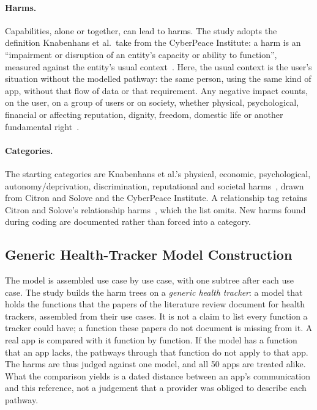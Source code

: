 \paragraph{Harms.} Capabilities, alone or together, can lead to harms. The
study adopts the definition Knabenhans et al.\ take from the CyberPeace
Institute: a harm is an \enquote{impairment or disruption of an entity's
capacity or ability to function}, measured against the entity's usual
context~\parencite[\S4.1]{knabenhans2026harms}. Here, the usual context is the
user's situation without the modelled pathway: the same person, using the same
kind of app, without that flow of data or that requirement. Any negative
impact counts, on the user, on a group of users or on society, whether
physical, psychological, financial or affecting reputation, dignity, freedom,
domestic life or another fundamental
right~\parencite[\S4.1]{knabenhans2026harms}.

\paragraph{Categories.} The starting categories are Knabenhans et al.'s physical, economic,
psychological, autonomy/\allowbreak deprivation, discrimination, reputational
and societal harms~\parencite[App.~A]{knabenhans2026harms}, drawn from Citron
and Solove and the CyberPeace Institute. A relationship tag retains Citron and
Solove's relationship harms~\parencite{citron2021harms}, which the list omits.
New harms found during coding are documented rather than forced into a
category.

\subsection{Generic Health-Tracker Model Construction}
\label{sec:generic-model}
The model is assembled use case by use case, with one subtree after each use case.
The study builds the harm trees on a \emph{generic health tracker}: a model that holds
the functions that the papers of the literature review document for health trackers, assembled
from their use cases. It is not a
claim to list every function a tracker could have; a function these papers do not document is
missing from it. A real app is compared with it function by function. If the model
has a function that an app lacks, the pathways through that function do not apply to
that app. The harms are thus judged against one model, and all 50 apps are treated
alike. What the comparison yields is a dated distance between an app's communication and this
reference, not a judgement that a provider was obliged to describe each pathway.


